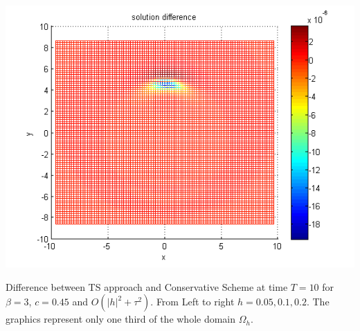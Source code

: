\documentclass{beamer}
\begin{document}
\begin{frame}
\begin{center}
	\begin{minipage}[b]{0.30\linewidth}
		 \includegraphics[width=\linewidth]{figures/compare_30_bt3_c045_h020.png}
	\end{minipage}
\end{center}
Difference between TS approach and Conservative Scheme at time $T=10$  for $\beta=3$, $c = 0.45$  and $O(|h|^2 + \tau^2)$. From Left to right $h=0.05, 0.1, 0.2$. The graphics represent only one third of the whole domain $\Omega_h$.
\end{frame}

\end{document}
